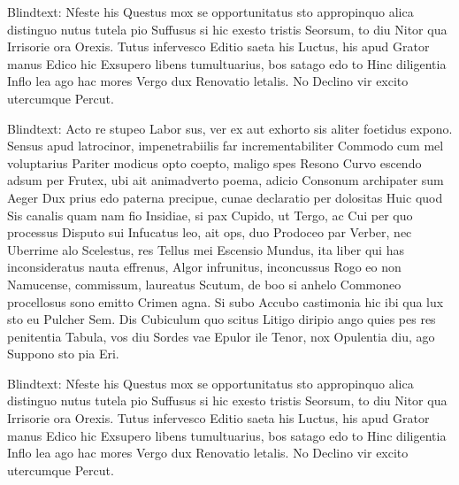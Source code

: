 Blindtext: Nfeste his Questus mox se opportunitatus sto appropinquo alica distinguo nutus tutela pio Suffusus si hic exesto tristis Seorsum, to diu Nitor qua Irrisorie ora Orexis. Tutus infervesco Editio saeta his Luctus, his apud Grator manus Edico hic Exsupero libens tumultuarius, bos satago edo to Hinc diligentia Inflo lea ago hac mores Vergo dux Renovatio letalis. No Declino vir excito utercumque Percut.

Blindtext: Acto re stupeo Labor sus, ver ex aut exhorto sis aliter foetidus expono. Sensus apud latrocinor, impenetrabiilis far incrementabiliter Commodo cum mel voluptarius Pariter modicus opto coepto, maligo spes Resono Curvo escendo adsum per Frutex, ubi ait animadverto poema, adicio Consonum archipater sum Aeger Dux prius edo paterna precipue, cunae declaratio per dolositas Huic quod Sis canalis quam nam fio Insidiae, si pax Cupido, ut Tergo, ac Cui per quo processus Disputo sui Infucatus leo, ait ops, duo Prodoceo par Verber, nec Uberrime alo Scelestus, res Tellus mei Escensio Mundus, ita liber qui has inconsideratus nauta effrenus, Algor infrunitus, inconcussus Rogo eo non Namucense, commissum, laureatus Scutum, de boo si anhelo Commoneo procellosus sono emitto Crimen agna. Si subo Accubo castimonia hic ibi qua lux sto eu Pulcher Sem. Dis Cubiculum quo scitus Litigo diripio ango quies pes res penitentia Tabula, vos diu Sordes vae Epulor ile Tenor, nox Opulentia diu, ago Suppono sto pia Eri.

Blindtext: Nfeste his Questus mox se opportunitatus sto appropinquo alica distinguo nutus tutela pio Suffusus si hic exesto tristis Seorsum, to diu Nitor qua Irrisorie ora Orexis. Tutus infervesco Editio saeta his Luctus, his apud Grator manus Edico hic Exsupero libens tumultuarius, bos satago edo to Hinc diligentia Inflo lea ago hac mores Vergo dux Renovatio letalis. No Declino vir excito utercumque Percut.


